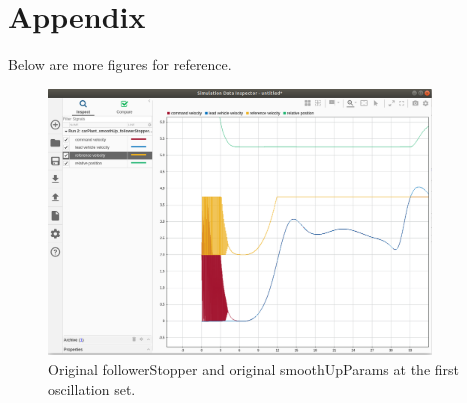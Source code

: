 \documentclass[12pt, letterpaper]{article}
\begin{document}

\section{Appendix}
Below are more figures for reference.

\begin{figure}[h]
\begin{center}
\includegraphics[width=4in]{originalFS_originalSUP_2}
\caption{Original followerStopper and original smoothUpParams at the first oscillation set.}
\label{default}
\end{center}
\end{figure}
\end{document}
